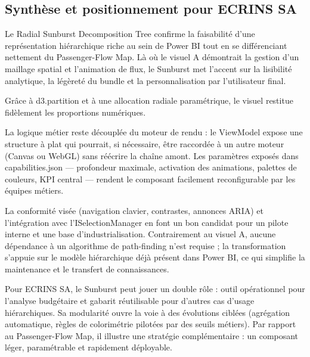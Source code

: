 \subsection{Synthèse et positionnement pour ECRINS SA}
\label{subsec:4B-synthese}

\setlength{\parindent}{0pt}

Le Radial Sunburst Decomposition Tree  confirme la faisabilité d’une représentation hiérarchique riche au sein de Power BI tout en se différenciant nettement du Passenger-Flow Map. Là où le visuel A démontrait la gestion d’un maillage spatial et l’animation de flux, le Sunburst met l’accent sur la lisibilité analytique, la légèreté du bundle et la personnalisation par l’utilisateur final.

Grâce à d3.partition et à une allocation radiale paramétrique, le visuel restitue fidèlement les proportions numériques. 

La logique métier reste découplée du moteur de rendu : le ViewModel expose une structure à plat qui pourrait, si nécessaire, être raccordée à un autre moteur (Canvas ou WebGL) sans réécrire la chaîne amont. Les paramètres exposés dans capabilities.json — profondeur maximale, activation des animations, palettes de couleurs, KPI central — rendent le composant facilement reconfigurable par les équipes métiers.

La conformité visée (navigation clavier, contrastes, annonces ARIA) et l’intégration avec l’ISelectionManager en font un bon candidat pour un pilote interne et une base d’industrialisation. Contrairement au visuel A, aucune dépendance à un algorithme de path-finding n’est requise ; la transformation s’appuie sur le modèle hiérarchique déjà présent dans Power BI, ce qui simplifie la maintenance et le transfert de connaissances.

Pour ECRINS SA, le Sunburst peut jouer un double rôle : outil opérationnel pour l’analyse budgétaire et gabarit réutilisable pour d’autres cas d’usage hiérarchiques. Sa modularité ouvre la voie à des évolutions ciblées (agrégation automatique, règles de colorimétrie pilotées par des seuils métiers). Par rapport au Passenger-Flow Map, il illustre une stratégie complémentaire : un composant léger, paramétrable et rapidement déployable. 
